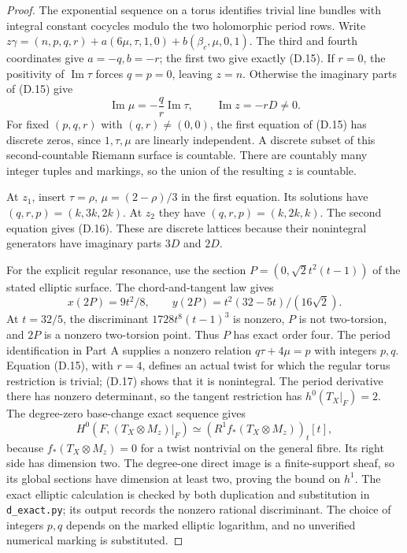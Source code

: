 \begin{proof}
The exponential sequence on a torus identifies trivial line bundles
with integral constant cocycles modulo the two holomorphic period
rows. Write
$z\gamma=(n,p,q,r)+a(6\mu,\tau,1,0)+b(\beta_c,\mu,0,1)$.
The third and fourth coordinates give $a=-q,b=-r$; the first two
give exactly (D.15). If $r=0$, the positivity of $\operatorname{Im}\tau$
forces $q=p=0$, leaving $z=n$. Otherwise the imaginary parts of
(D.15) give
\[
 \operatorname{Im}\mu=-\frac qr\operatorname{Im}\tau,
 \qquad\operatorname{Im}z=-rD\ne0.                    \tag{D.17}
\]
For fixed $(p,q,r)$ with $(q,r)\ne(0,0)$, the first equation of
(D.15) has discrete zeros, since $1,\tau,\mu$ are linearly
independent. A discrete subset of this second-countable Riemann
surface is countable. There are countably many integer tuples and
markings, so the union of the resulting $z$ is countable.

At $z_1$, insert $\tau=\rho$, $\mu=(2-\rho)/3$ in the first
equation. Its solutions have $(q,r,p)=(k,3k,2k)$.
At $z_2$ they have $(q,r,p)=(k,2k,k)$.
The second equation gives (D.16). These are discrete lattices because
their nonintegral generators have imaginary parts $3D$ and $2D$.

For the explicit regular resonance, use the section
$P=(0,\sqrt2t^2(t-1))$ of the stated elliptic surface. The
chord-and-tangent law gives
\[
 x(2P)=9t^2/8,\qquad
 y(2P)=t^2(32-5t)/(16\sqrt2).
\]
At $t=32/5$, the discriminant
$1728t^8(t-1)^3$ is nonzero, $P$ is not two-torsion, and $2P$ is a
nonzero two-torsion point. Thus $P$ has exact order four. The period
identification in Part A supplies a nonzero relation
$q\tau+4\mu=p$ with integers $p,q$. Equation (D.15), with $r=4$,
defines an actual twist for which the regular torus restriction is
trivial; (D.17) shows that it is nonintegral. The period derivative
there has nonzero determinant, so the tangent restriction has
$h^0(T_X|_F)=2$. The degree-zero base-change exact sequence gives
\[
 H^0(F,(T_X\otimes M_z)|_F)
   \simeq (R^1f_*(T_X\otimes M_z))_t[t],
\]
because $f_*(T_X\otimes M_z)=0$ for a twist nontrivial on the general
fibre. Its right side has dimension two. The degree-one direct image
is a finite-support sheaf, so its global sections have dimension at
least two, proving the bound on $h^1$. The exact elliptic calculation
is checked by both duplication and substitution in
\texttt{d\_exact.py}; its output records the nonzero rational
discriminant. The choice of integers $p,q$ depends on the marked
elliptic logarithm, and no unverified numerical marking is substituted.
\end{proof}

